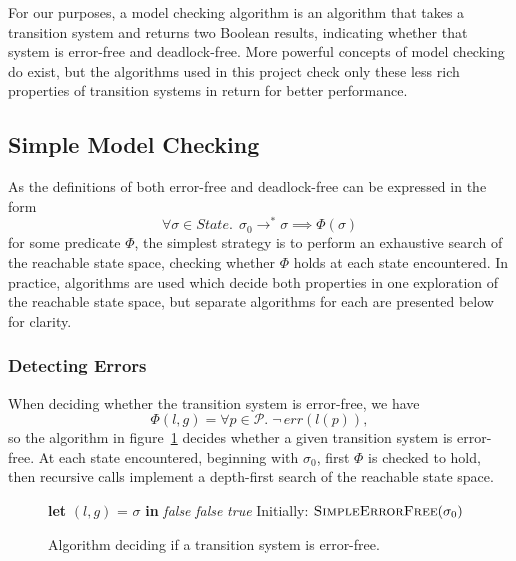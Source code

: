 \documentclass[12pt,a4paper,twoside,openright]{report}
\newcommand{\Let}[2]{\State \textbf{let} #1 = #2 \textbf{in}}
\begin{document}
For our purposes, a model checking algorithm is an
algorithm that takes a transition system and returns
two Boolean results, indicating whether that system
is error-free and deadlock-free. More
powerful concepts of model checking do exist,
but the algorithms used in this project check
only these less rich properties of transition
systems in return for better performance.

\subsection{Simple Model Checking} \label{sec:simple-model-checking}
As the definitions of both error-free and deadlock-free
can be expressed in the form
\[
	\forall \sigma \in \textit{State}.\;\, \sigma_0 \longrightarrow^* \sigma
	\implies \Phi (\sigma)
\]
for some predicate $\Phi$, the simplest strategy is to
perform an exhaustive search of the reachable state space,
checking whether $\Phi$ holds at each state encountered.
In practice, algorithms are used which decide both
properties in one exploration of the reachable state space,
but separate algorithms for each are presented
below for clarity.

\subsubsection{Detecting Errors}
When deciding whether the transition system
is error-free, we have
\[
	\Phi(l, g) = \forall p \in \mathcal{P}.\; \neg\,err(l(p)),
\]
so the algorithm in figure~\ref{fig:simple-error-free}
decides whether a given transition system
is error-free. At each
state encountered, beginning with $\sigma_0$, first $\Phi$
is checked to hold, then recursive calls implement a
depth-first search of the reachable state space.

\begin{figure}
	\begin{algorithmic}[1]
	\Let{$(l, g)$}{$\sigma$}
		\Return \textit{false}
		\EndIf
	\EndFor {}
		\Return \textit{false}
		\EndIf
	\EndFor
	\State \Return \textit{true}
	\EndProcedure
	\State
	\State Initially: $\textsc{SimpleErrorFree}(\sigma_0)$
	\end{algorithmic}
	\caption{Algorithm deciding if a transition system is error-free.}
	\label{fig:simple-error-free}
\end{figure}
\end{document}
